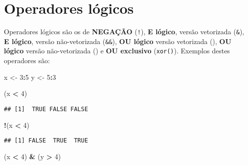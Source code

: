 \documentclass[
]{book}
\newenvironment{Shaded}{\begin{snugshade}}{\end{snugshade}}
\newcommand{\DecValTok}[1]{\textcolor[rgb]{0.00,0.00,0.81}{#1}}
\newcommand{\NormalTok}[1]{#1}
\newcommand{\OperatorTok}[1]{\textcolor[rgb]{0.81,0.36,0.00}{\textbf{#1}}}
\newcommand{\StringTok}[1]{\textcolor[rgb]{0.31,0.60,0.02}{#1}}
\begin{document}
\hypertarget{operadores-luxf3gicos}{%
\section{Operadores lógicos}\label{operadores-luxf3gicos}}

Operadores lógicos são os de \textbf{NEGAÇÃO} (\texttt{!}), \textbf{E lógico}, versão vetorizada (\texttt{\&}), \textbf{E lógico}, versão não-vetorizada (\texttt{\&\&}), \textbf{OU lógico} versão vetorizada (\texttt{\textbar{}}), \textbf{OU lógico} versão não-vetorizada (\texttt{\textbar{}\textbar{}}) e \textbf{OU exclusivo} (\texttt{xor()}). Exemplos destes operadores são:

\begin{Shaded}
\begin{Highlighting}[]
\NormalTok{x <-}\StringTok{ }\DecValTok{3}\OperatorTok{:}\DecValTok{5}
\NormalTok{y <-}\StringTok{ }\DecValTok{5}\OperatorTok{:}\DecValTok{3}
\end{Highlighting}
\end{Shaded}

\begin{Shaded}
\begin{Highlighting}[]
\NormalTok{(x }\OperatorTok{<}\StringTok{ }\DecValTok{4}\NormalTok{)}
\end{Highlighting}
\end{Shaded}

\begin{verbatim}
## [1]  TRUE FALSE FALSE
\end{verbatim}

\begin{Shaded}
\begin{Highlighting}[]
\OperatorTok{!}\NormalTok{(x }\OperatorTok{<}\StringTok{ }\DecValTok{4}\NormalTok{)}
\end{Highlighting}
\end{Shaded}

\begin{verbatim}
## [1] FALSE  TRUE  TRUE
\end{verbatim}

\begin{Shaded}
\begin{Highlighting}[]
\NormalTok{(x }\OperatorTok{<}\StringTok{ }\DecValTok{4}\NormalTok{) }\OperatorTok{&}\StringTok{ }\NormalTok{(y }\OperatorTok{>}\StringTok{ }\DecValTok{4}\NormalTok{)}
\end{Highlighting}
\end{Shaded}
\end{document}
